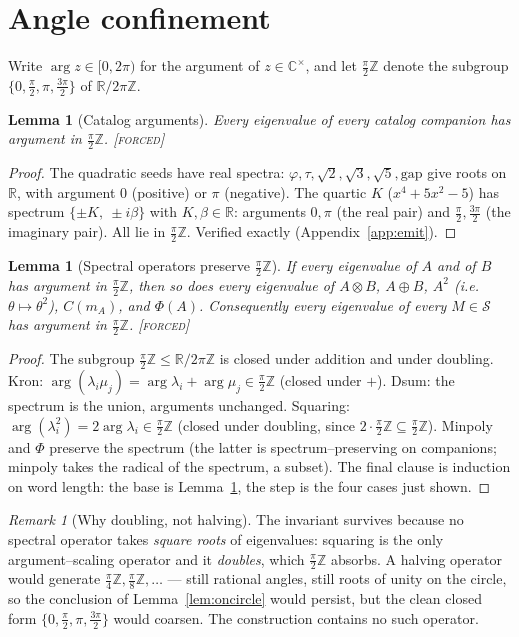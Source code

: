 \documentclass[11pt]{article}
\theoremstyle{plain}
\newtheorem{lemma}[theorem]{Lemma}
\theoremstyle{definition}
\theoremstyle{remark}
\newtheorem{remark}[theorem]{Remark}
\newcommand{\forced}{\textcolor{forcedc}{\textsc{[forced]}}}
\newcommand{\R}{\mathbb{R}}
\newcommand{\Z}{\mathbb{Z}}
\newcommand{\Cx}{\mathbb{C}}
\newcommand{\Scal}{\mathcal{S}}
\begin{document}
\section{Angle confinement}\label{sec:confine}

Write $\arg z\in[0,2\pi)$ for the argument of $z\in\Cx^\times$, and let $\tfrac\pi2\Z$ denote the subgroup $\{0,\tfrac\pi2,\pi,\tfrac{3\pi}2\}$ of $\R/2\pi\Z$.

\begin{lemma}[Catalog arguments]\label{lem:catargs}
Every eigenvalue of every catalog companion has argument in $\tfrac\pi2\Z$. \forced
\end{lemma}

\begin{proof}
The quadratic seeds have real spectra: $\varphi,\tau,\sqrt2,\sqrt3,\sqrt5,\mathrm{gap}$ give roots on $\R$, with argument $0$ (positive) or $\pi$ (negative). The quartic $K$ ($x^4+5x^2-5$) has spectrum $\{\pm K,\ \pm i\beta\}$ with $K,\beta\in\R$: arguments $0,\pi$ (the real pair) and $\tfrac\pi2,\tfrac{3\pi}2$ (the imaginary pair). All lie in $\tfrac\pi2\Z$. Verified exactly (Appendix~\ref{app:emit}). \end{proof}

\begin{lemma}[Spectral operators preserve $\tfrac\pi2\Z$]\label{lem:closure}
If every eigenvalue of $A$ and of $B$ has argument in $\tfrac\pi2\Z$, then so does every eigenvalue of $A\otimes B$, $A\oplus B$, $A^2$ (i.e.\ $\theta\mapsto\theta^2$), $C(m_A)$, and $\Phi(A)$. Consequently every eigenvalue of every $M\in\Scal$ has argument in $\tfrac\pi2\Z$. \forced
\end{lemma}

\begin{proof}
The subgroup $\tfrac\pi2\Z\le\R/2\pi\Z$ is closed under addition and under doubling. Kron: $\arg(\lambda_i\mu_j)=\arg\lambda_i+\arg\mu_j\in\tfrac\pi2\Z$ (closed under $+$). Dsum: the spectrum is the union, arguments unchanged. Squaring: $\arg(\lambda_i^2)=2\arg\lambda_i\in\tfrac\pi2\Z$ (closed under doubling, since $2\cdot\tfrac\pi2\Z\subseteq\tfrac\pi2\Z$). Minpoly and $\Phi$ preserve the spectrum (the latter is spectrum--preserving on companions; minpoly takes the radical of the spectrum, a subset). The final clause is induction on word length: the base is Lemma~\ref{lem:catargs}, the step is the four cases just shown. \end{proof}

\begin{remark}[Why doubling, not halving]\label{rem:nohalve}
The invariant survives because no spectral operator takes \emph{square roots} of eigenvalues: squaring is the only argument--scaling operator and it \emph{doubles}, which $\tfrac\pi2\Z$ absorbs. A halving operator would generate $\tfrac\pi4\Z,\tfrac\pi8\Z,\dots$ --- still rational angles, still roots of unity on the circle, so the conclusion of Lemma~\ref{lem:oncircle} would persist, but the clean closed form $\{0,\tfrac\pi2,\pi,\tfrac{3\pi}2\}$ would coarsen. The construction contains no such operator.
\end{remark}
\end{document}
